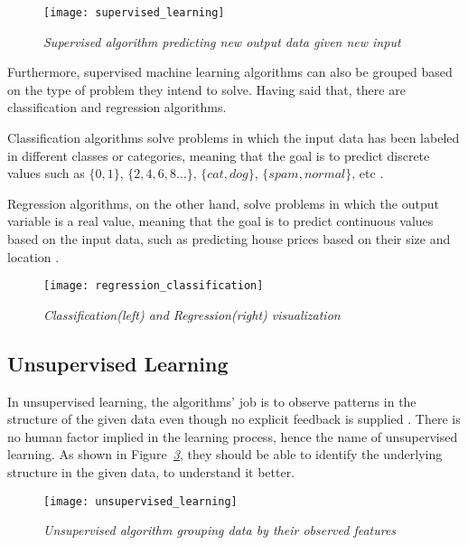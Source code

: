 \begin{figure}[h]
  \centering
  \texttt{[image: supervised\_learning]}
  \caption{\emph{Supervised algorithm predicting new output data given new input  \cite{typesML}}}
  \label{fig:supervised}
\end{figure}

Furthermore, supervised machine learning algorithms can also
be grouped based on the type of problem they intend to solve.
Having said that, there are classification and regression algorithms.

Classification algorithms solve problems in which the input data has
been labeled in different classes or categories,
meaning that the goal is to predict discrete values
such as $\{0, 1\}$, $\{2, 4, 6, 8\dots\}$, $\{cat, dog\}$, $\{spam, normal\}$, etc \cite{typesMLMedium}.

Regression algorithms, on the other hand, solve problems in which the output variable
is a real value, meaning that the goal is to predict continuous values based on the
input data, such as predicting house prices based on their size and location \cite{typesMLMedium}.

\begin{figure}[h]
  \centering
  \texttt{[image: regression\_classification]}
  \caption{\emph{Classification(left) and Regression(right) visualization  \cite{bigDataR}}}
  \label{fig:regression_classification}
\end{figure}


\subsection{Unsupervised Learning}
In unsupervised learning, the algorithms' job is to observe patterns in
the structure of the given data even though no explicit feedback is supplied \cite{amai}.
There is no human factor implied in the learning process,
hence the name of unsupervised learning.
As shown in Figure\emph{~\ref{fig:unsupervised}}, they should be able to identify the underlying
structure in the given data, to understand it better\cite{bigDataR}.

\begin{figure}[h]
  \centering
  \texttt{[image: unsupervised\_learning]}
  \caption{\emph{Unsupervised algorithm grouping data by their observed features \cite{typesML}}}
  \label{fig:unsupervised}
\end{figure}

